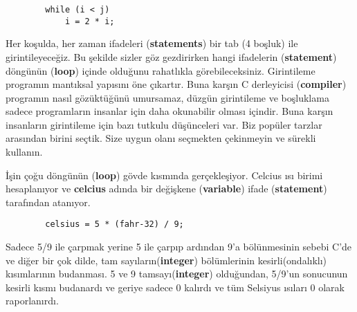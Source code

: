 \documentclass[a4paper,12pt,oneside]{book}
\begin{document}
\begin{lstlisting}
        while (i < j)
            i = 2 * i;
\end{lstlisting}
Her koşulda, her zaman ifadeleri (\textbf{statements}) bir tab (4 boşluk) ile girintileyeceğiz. Bu şekilde sizler göz gezdirirken hangi ifadelerin (\textbf{statement}) döngünün (\textbf{loop}) içinde olduğunu rahatlıkla görebileceksiniz. Girintileme programın mantıksal yapısını öne çıkartır. Buna karşın C derleyicisi (\textbf{compiler}) programın nasıl gözüktüğünü umursamaz, düzgün girintileme ve boşluklama sadece programların insanlar için daha okunabilir olması içindir. Buna karşın insanların girintileme için bazı tutkulu düşünceleri var. Biz popüler tarzlar arasından birini seçtik. Size uygun olanı seçmekten çekinmeyin ve sürekli kullanın. \pagebreak
\par İşin çoğu döngünün (\textbf{loop}) gövde kısmında gerçekleşiyor. Celcius ısı birimi hesaplanıyor ve \textbf{celcius} adında bir değişkene (\textbf{variable}) ifade (\textbf{statement}) tarafından atanıyor.
\begin{lstlisting}
        celsius = 5 * (fahr-32) / 9;
\end{lstlisting}
Sadece 5/9 ile çarpmak yerine 5 ile çarpıp ardından 9'a bölünmesinin sebebi C'de ve diğer bir çok dilde, tam sayıların(\textbf{integer}) bölümlerinin kesirli(ondalıklı) kısımlarının budanması. 5 ve 9 tamsayı(\textbf{integer}) olduğundan, 5/9'un sonucunun kesirli kısmı budanardı ve geriye sadece 0 kalırdı ve tüm Selsiyus ısıları 0 olarak raporlanırdı.
\end{document}
